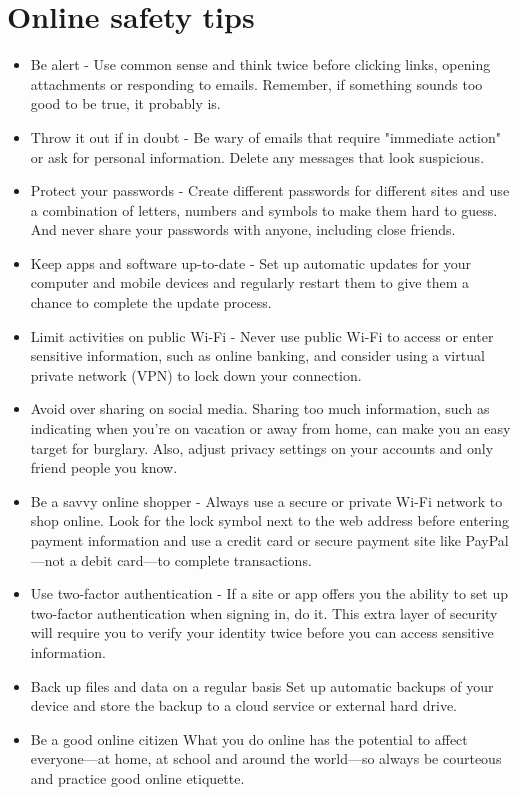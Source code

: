 \documentclass[11pt,a4paper,twoside]{article}
\begin{document}
\section{Online safety tips}
\begin{itemize}
\item Be alert - Use common sense and think twice before clicking links, opening attachments or responding to emails. Remember, if something sounds too good to be true, it probably is.
\item Throw it out if in doubt - Be wary of emails that require "immediate action" or ask for personal information. Delete any messages that look suspicious.
\item Protect your passwords - Create different passwords for different sites and use a combination of letters, numbers and symbols to make them hard to guess. And never share your passwords with anyone, including close friends.
\item Keep apps and software up-to-date - Set up automatic updates for your computer and mobile devices and regularly restart them to give them a chance to complete the update process.
\item Limit activities on public Wi-Fi - Never use public Wi-Fi to access or enter sensitive information, such as online banking, and consider using a virtual private network (VPN) to lock down your connection.
\item Avoid over sharing on social media. Sharing too much information, such as indicating when you're on vacation or away from home, can make you an easy target for burglary. Also, adjust privacy settings on your accounts and only friend people you know.
\item Be a savvy online shopper - Always use a secure or private Wi-Fi network to shop online. Look for the lock symbol next to the web address before entering payment information and use a credit card or secure payment site like PayPal—not a debit card—to complete transactions.
\item Use two-factor authentication - If a site or app offers you the ability to set up two-factor authentication when signing in, do it. This extra layer of security will require you to verify your identity twice before you can access sensitive information.
\item Back up files and data on a regular basis 	Set up automatic backups of your device and store the backup to a cloud service or external hard drive.
\item Be a good online citizen 	What you do online has the potential to affect everyone—at home, at school and around the world—so always be courteous and practice good online etiquette.
\end{itemize}
\newpage
\end{document}

